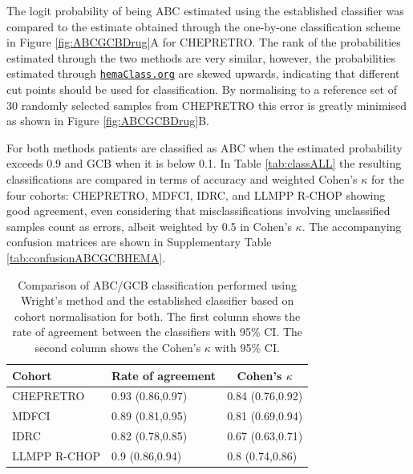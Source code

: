 \documentclass{article}
\newcommand{\hemaClass}{\href{http://hemaClass.org}{\texttt{hemaClass.org}}}
\begin{document}
The logit probability of being ABC estimated using the established classifier was compared to the estimate obtained through the one-by-one classification scheme in Figure \ref{fig:ABCGCBDrug}A for CHEPRETRO.
The rank of the probabilities estimated through the two methods are very similar, however, the probabilities estimated through \hemaClass{} are skewed upwards, indicating that different cut points should be used for classification.
By normalising to a reference set of 30 randomly selected samples from CHEPRETRO this error is greatly minimised as shown in Figure \ref{fig:ABCGCBDrug}B.

For both methods patients are classified as ABC when the estimated probability exceeds 0.9 and GCB when it is below 0.1.
In Table \ref{tab:classALL} the resulting classifications are compared in terms of accuracy and weighted Cohen's $\kappa$ for the four cohorts: CHEPRETRO, MDFCI, IDRC, and LLMPP R-CHOP showing good agreement, even considering that misclassifications involving unclassified samples count as errors, albeit weighted by 0.5 in Cohen's $\kappa$.
The accompanying confusion matrices are shown in Supplementary Table \ref{tab:confusionABCGCBHEMA}.

\begin{table}
\small
\caption{Comparison of ABC/GCB classification performed using Wright's method and the established classifier based on cohort normalisation for both.
The first column shows the rate of agreement between the classifiers with 95\% CI.
The second column shows the Cohen's $\kappa$ with 95\% CI.\label{tab:ABCGCBclassifier}}
\begin{center}
\begin{tabular}{lll}
\hline\hline
\multicolumn{1}{l}{Cohort}&\multicolumn{1}{c}{Rate of agreement}&\multicolumn{1}{c}{Cohen's $\kappa$}\tabularnewline
\hline
CHEPRETRO&0.93 (0.86,0.97)&0.84 (0.76,0.92)\tabularnewline
MDFCI&0.89 (0.81,0.95)&0.81 (0.69,0.94)\tabularnewline
IDRC&0.82 (0.78,0.85)&0.67 (0.63,0.71)\tabularnewline
LLMPP R-CHOP&0.9 (0.86,0.94)&0.8 (0.74,0.86)\tabularnewline
\hline
\end{tabular}
\end{center}
\end{table}



%
\end{document}
